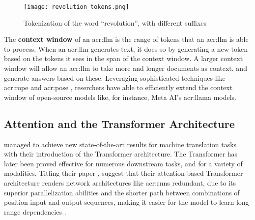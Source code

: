 \begin{figure}[htp]
    \centering
    \texttt{[image: revolution\_tokens.png]}
    \caption{Tokenization of the word \enquote{revolution}, with different suffixes}
    \label{fig:tokenization-revolution}
\end{figure}

The \textbf{context window} of an \acrshort{acr:llm} is the range of tokens that an \acrshort{acr:llm} is able to process. When an \acrshort{acr:llm} generates text, it does so by generating a new token based on the tokens it sees in the span of the context window. A larger context window will allow an \acrshort{acr:llm} to take more and longer documents as context, and generate answers based on these. Leveraging sophisticated techniques like \gls{acr:rope} \citep{suRoFormerEnhancedTransformer2024} and \gls{acr:pose} \citep{zhuPoSEEfficientContext2024}, reserchers have able to efficiently extend the context window of open-source models like, for instance, Meta AI's \acrshort{acr:llama} models.


\subsection{Attention and the Transformer Architecture}
\label{subsec:attention-and-the-transformer-architecture}

\cite{vaswaniAttentionAllYou2017} managed to achieve new state-of-the-art results for machine translation tasks with their introduction of the Transformer architecture. The Transformer has later been proved effective for numerous downstream tasks, and for a variety of modalities. Titling their paper , \citeauthor{vaswaniAttentionAllYou2017} suggest that their attention-based Transformer architecture renders network architectures like \glspl{acr:rnn} redundant, due to its superior parallelization abilities and the shorter path between combinations of position input and output sequences, making it easier for the model to learn long-range dependencies \citep[6]{vaswaniAttentionAllYou2017}.


